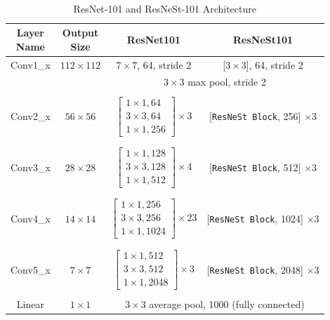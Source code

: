 \documentclass [MAS] {uclathes}
\begin{document}
\

\begin{table}[h!]
\centering
\footnotesize 
\renewcommand{\arraystretch}{0.7}
\begin{tabular}{ c | c | c | c } 
\hline
\makecell{\textbf{Layer} \\ \textbf{Name}} & \makecell{\textbf{Output} \\ \textbf{Size}} & \textbf{ResNet101} & \textbf{ResNeSt101}\\ 
\hline
\hline
Conv1\_x & $112 \times 112$ & $7 \times 7$, 64, stride 2 & [$3\times 3$], 64, stride 2\\
\hline
 &  & \multicolumn{2}{c}{$3 \times 3$ max pool, stride 2}\\
\hline
&  & & \\
Conv2\_x & $56 \times 56$ & $\begin{bmatrix} 1 \times 1, 64  \\ 3 \times 3, 64 \\ 1 \times 1, 256 \end{bmatrix} \times 3$ & [\texttt{ResNeSt Block}, 256] $\times 3$\\
&  & & \\
\hline
&  & & \\
Conv3\_x & $28 \times 28$ & $\begin{bmatrix} 1 \times 1, 128  \\ 3 \times 3, 128 \\ 1 \times 1, 512 \end{bmatrix} \times 4$ & [\texttt{ResNeSt Block}, 512] $\times 3$\\
&  & & \\
\hline
&  & & \\
Conv4\_x & $14 \times 14$ & $\begin{bmatrix} 1 \times 1, 256  \\ 3 \times 3, 256 \\ 1 \times 1, 1024 \end{bmatrix} \times 23$ & [\texttt{ResNeSt Block}, 1024] $\times 3$\\
&  & & \\
\hline
&  & & \\
Conv5\_x & $7 \times 7$ & $\begin{bmatrix} 1 \times 1, 512  \\ 3 \times 3, 512 \\ 1 \times 1, 2048 \end{bmatrix} \times 3$ & [\texttt{ResNeSt Block}, 2048] $\times 3$\\
&  & & \\
\hline
Linear & $1 \times 1$ & \multicolumn{2}{c}{$3 \times 3$ average pool, 1000 (fully connected)}\\
\hline  
\end{tabular}
\label{tab:resnet_resnest_archs}
\caption{ResNet-101 and ResNeSt-101 Architecture}
\end{table}
\end{document}
